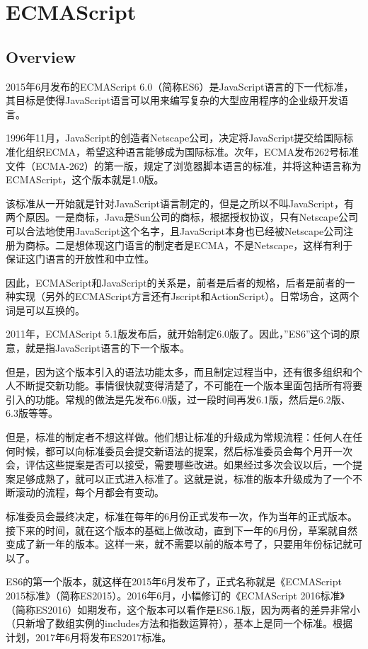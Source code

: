\part{ECMAScript}

\chapter{Overview}


2015年6月发布的ECMAScript 6.0（简称ES6）是JavaScript语言的下一代标准，其目标是使得JavaScript语言可以用来编写复杂的大型应用程序的企业级开发语言。



1996年11月，JavaScript的创造者Netscape公司，决定将JavaScript提交给国际标准化组织ECMA，希望这种语言能够成为国际标准。次年，ECMA发布262号标准文件（ECMA-262）的第一版，规定了浏览器脚本语言的标准，并将这种语言称为ECMAScript，这个版本就是1.0版。

该标准从一开始就是针对JavaScript语言制定的，但是之所以不叫JavaScript，有两个原因。一是商标，Java是Sun公司的商标，根据授权协议，只有Netscape公司可以合法地使用JavaScript这个名字，且JavaScript本身也已经被Netscape公司注册为商标。二是想体现这门语言的制定者是ECMA，不是Netscape，这样有利于保证这门语言的开放性和中立性。

因此，ECMAScript和JavaScript的关系是，前者是后者的规格，后者是前者的一种实现（另外的ECMAScript方言还有Jscript和ActionScript）。日常场合，这两个词是可以互换的。

2011年，ECMAScript 5.1版发布后，就开始制定6.0版了。因此，”ES6”这个词的原意，就是指JavaScript语言的下一个版本。

但是，因为这个版本引入的语法功能太多，而且制定过程当中，还有很多组织和个人不断提交新功能。事情很快就变得清楚了，不可能在一个版本里面包括所有将要引入的功能。常规的做法是先发布6.0版，过一段时间再发6.1版，然后是6.2版、6.3版等等。

但是，标准的制定者不想这样做。他们想让标准的升级成为常规流程：任何人在任何时候，都可以向标准委员会提交新语法的提案，然后标准委员会每个月开一次会，评估这些提案是否可以接受，需要哪些改进。如果经过多次会议以后，一个提案足够成熟了，就可以正式进入标准了。这就是说，标准的版本升级成为了一个不断滚动的流程，每个月都会有变动。

标准委员会最终决定，标准在每年的6月份正式发布一次，作为当年的正式版本。接下来的时间，就在这个版本的基础上做改动，直到下一年的6月份，草案就自然变成了新一年的版本。这样一来，就不需要以前的版本号了，只要用年份标记就可以了。

ES6的第一个版本，就这样在2015年6月发布了，正式名称就是《ECMAScript 2015标准》（简称ES2015）。2016年6月，小幅修订的《ECMAScript 2016标准》（简称ES2016）如期发布，这个版本可以看作是ES6.1版，因为两者的差异非常小（只新增了数组实例的includes方法和指数运算符），基本上是同一个标准。根据计划，2017年6月将发布ES2017标准。

